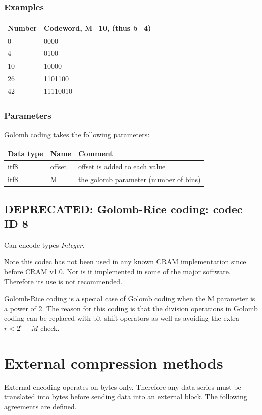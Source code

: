 \documentclass[a4paper]{article}
\begin{document}
\subsubsection*{Examples}

\begin{tabular}{|>{\raggedright}p{76pt}|>{\raggedright}p{107pt}|}
\hline
\textbf{Number} & \textbf{Codeword, M=10, (thus b=4)}\tabularnewline
\hline
0 & 0000\tabularnewline
\hline
4 & 0100\tabularnewline
\hline
10 & 10000\tabularnewline
\hline
26 & 1101100\tabularnewline
\hline
42 & 11110010\tabularnewline
\hline
\end{tabular}

\subsubsection*{Parameters}

Golomb coding takes the following parameters: 

\begin{tabular}{|>{\raggedright}p{144pt}|>{\raggedright}p{144pt}|>{\raggedright}p{144pt}|}
\hline
\textbf{Data type} & \textbf{Name} & \textbf{Comment}\tabularnewline
\hline
itf8 & offset & offset is added to each value\tabularnewline
\hline
itf8 & M & the golomb parameter (number of bins)\tabularnewline
\hline
\end{tabular}

\subsection{DEPRECATED: Golomb-Rice coding: codec ID 8}

Can encode types \textit{Integer}.

Note this codec has not been used in any known CRAM implementation since before CRAM v1.0.
Nor is it implemented in some of the major software.
Therefore its use is not recommended.

Golomb-Rice coding is a special case of Golomb coding when the M parameter is a power of 2.
The reason for this coding is that the division operations in Golomb coding can be replaced with bit shift operators as well as avoiding the extra $r < 2^{b}-M$ check.

\section{\textbf{External compression methods}}

External encoding operates on bytes only. Therefore any data series must be translated 
into bytes before sending data into an external block. The following agreements 
are defined. 
\end{document}
